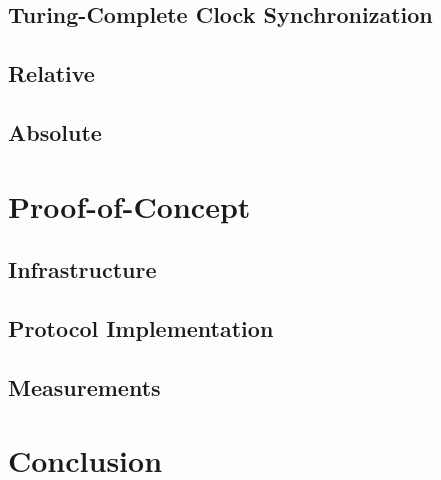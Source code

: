 

\subsection{Turing-Complete Clock Synchronization} \label{sec:protocol-fundamentals-clock}



\subsection{Relative \pol{}} \label{sec:protocol-fundamentals-rel-pol}



\subsection{Absolute \pol{}} \label{sec:protocol-fundamentals-abs-pol}



\newpage
\section{Proof-of-Concept} \label{sec:proof-of-concept}



\subsection{Infrastructure} \label{sec:proof-of-concept-infrastructure}



\subsection{Protocol Implementation} \label{sec:proof-of-concept-pol-implementation}



\subsection{Measurements} \label{sec:proof-of-concept-results}



\newpage

\section{Conclusion} \label{sec:conclusion}



\newpage



\newpage


